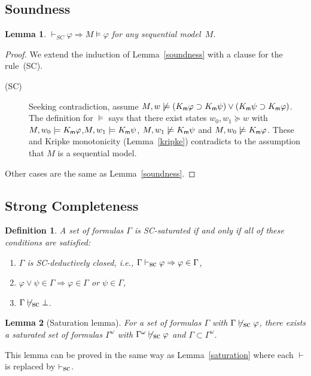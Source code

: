 \documentclass[doctor]{iscs-thesis}
\newcommand{\vdashsc}{\vdash_{\mbox{\rm sc}}}
\newcommand{\memory}{{\sf m}}
\newtheorem{definition}{Definition}
\newtheorem{lemma}{Lemma}
\begin{document}
\subsection{Soundness}
\begin{lemma}
 \label{sc-sound}
 $\vdash_{SC} \varphi \Rightarrow M\models\varphi$ for any sequential model~$M$.
\end{lemma}
\begin{proof}
 We extend the induction of Lemma~\ref{soundness} with a clause for the rule~(SC).
\begin{description}
 \item[(SC)] Seeking contradiction, assume $M, w\not\models (K_\memory \varphi\supset
	    K_\memory \psi)\vee (K_\memory \psi\supset K_\memory \varphi)$.
	    The definition for $\models$ says that there exist states $w_0, w_1\succeq w$
	    with $M, w_0\models K_\memory\varphi$,\quad $M, w_1\models K_\memory\psi$,\quad
	    $M, w_1\not\models K_\memory\psi$ and $M, w_0\not\models K_\memory\varphi$.
	    These and Kripke monotonicity (Lemma~\ref{kripke}) contradicts to the
	    assumption that $M$ is a sequential model.
\end{description}
Other cases are the same as Lemma~\ref{soundness}.
\end{proof}
\subsection{Strong Completeness}
\begin{definition}
 A set of formulas $\Gamma$ is \textit{SC-saturated} if and only if all of these
 conditions are satisfied:
\begin{enumerate}
 \item $\Gamma$ is SC-deductively closed, i.e., $\Gamma\vdashsc\varphi\Rightarrow \varphi\in\Gamma$,
 \item $\varphi\vee\psi\in\Gamma \Rightarrow \varphi\in\Gamma$ or $\psi\in\Gamma$,
 \item $\Gamma\not\vdashsc\bot$.
\end{enumerate}
\end{definition}

\begin{lemma}[Saturation lemma]
\label{sc-saturation}
 For a set of formulas $\Gamma$ with $\Gamma\not\vdashsc\varphi$, there exists a saturated
 set of formulas $\Gamma^\omega$ with $\Gamma^\omega\not\vdashsc\varphi$
 and $\Gamma\subset \Gamma^\omega$.
\end{lemma}
\noindent 
This lemma can be proved in the same way as Lemma~\ref{saturation} where each $\vdash$ is replaced by $\vdashsc$.
\end{document}
